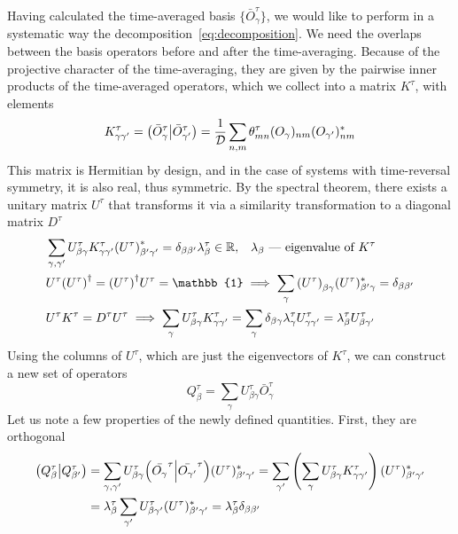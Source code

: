 Having calculated the time-averaged basis \( \{\bar{O}_{\gamma}^{\tau}\} \), we would like to perform in a 
systematic way the decomposition~\ref{eq:decomposition}. We need the overlaps between the basis operators
before and after the time-averaging. Because of the projective character of the time-averaging, they are
given by the pairwise inner products of the time-averaged operators, which we collect into a matrix
\(K^{\tau}\), with elements
\begin{equation}
    K^{\tau}_{\gamma\gamma^{\prime}} = \left(\bar{O}_{\gamma}^{\tau} \middle| \bar{O}_{\gamma^{\prime}}^{\tau}\right) = \frac{1}{\mathcal{D}}\sum_{n,m} \theta_{mn}^{\tau} (O_{\gamma})_{nm} (O_{\gamma^{\prime}})_{nm}^{\ast}
    \label{eq:overlap_matrix}
\end{equation}
This matrix is Hermitian by design, and in the case of systems with time-reversal symmetry, it is also real,
thus symmetric. By the spectral theorem, there exists a unitary matrix \(U^{\tau}\) that transforms it
via a similarity transformation to a diagonal matrix \(D^{\tau}\)
\begin{align}
    &\sum_{\gamma,\gamma^{\prime}} U^{\tau}_{\beta \gamma} K_{\gamma\gamma^{\prime}}^{\tau} {(U^{\tau})}_{\beta^{\prime} \gamma^{\prime}}^{\ast}=\delta_{\beta\beta^{\prime}} \lambda^{\tau}_{\beta} \in
     \RR,\;\;\; \lambda_{\beta} \text{ --- eigenvalue of }K^{\tau} \label{eq:property diag} \\
    &U^{\tau}{(U^{\tau})}^{\dag} = {(U^{\tau})}^{\dag}U^{\tau} = \mathbb{1} \implies \sum_{\gamma} {(U^{\tau})}_{\beta\gamma}(U^{\tau})_{\beta^{\prime}\gamma}^{\ast} =
     \delta_{\beta\beta^{\prime}} \label{eq:propery_ortho}\\
    & U^{\tau} K^{\tau} = D^{\tau} U^{\tau} \implies \sum_{\gamma} U^{\tau}_{\beta\gamma} K_{\gamma\gamma^{\prime}}^{\tau} = \sum_{\gamma}  \delta_{\beta\gamma} \lambda^{\tau}_{\gamma} U^{\tau}_{\gamma\gamma^{\prime}} = \lambda^{\tau}_{\beta} U^{\tau}_{\beta\gamma^{\prime}}\label{eq:property}
  \end{align} 
Using the columns of \(U^{\tau}\), which are just the eigenvectors of \(K^{\tau}\), we can construct a new set of operators
\begin{equation}
    Q_{\beta}^{\tau} = \sum_{\gamma} U^{\tau}_{\beta \gamma} \bar{O}_{\gamma}^{\tau}
    \label{eq:liom}
\end{equation}
Let us note a few properties of the newly defined quantities. First, they are orthogonal
\begin{align}
    \left(Q^{\tau}_\beta \middle| Q^{\tau}_{\beta^{\prime}}\right) &= \sum_{\gamma,\gamma^{\prime}} U^{\tau}_{\beta\gamma} {\left(\bar{O_{\gamma}}^{\tau} \middle| \bar{O_{\gamma^{\prime}}}^{\tau}\right)} (U^{\tau})_{\beta^{\prime}\gamma^{\prime}}^{\ast} 
    = \sum_{\gamma^{\prime}} \left(\sum_{\gamma}U^{\tau}_{\beta\gamma} K_{\gamma\gamma^{\prime}}^{\tau}\right)  (U^{\tau})_{\beta^{\prime}{\gamma^{\prime}}}^{\ast}\nonumber \\ 
    &= \lambda^{\tau}_{\beta} \sum_{\gamma^{\prime}} U^{\tau}_{\beta\gamma^{\prime}} (U^{\tau})_{\beta^{\prime}\gamma^{\prime}}^{\ast} = \lambda^{\tau}_{\beta} \delta_{\beta\beta^{\prime}}
  \end{align}
